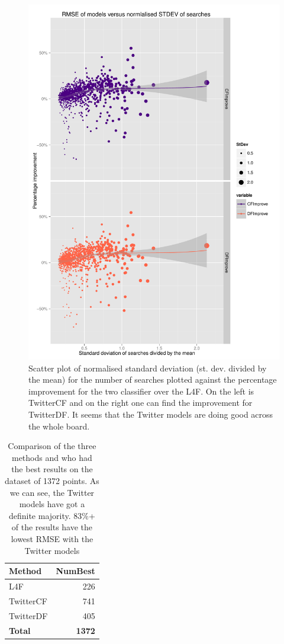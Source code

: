 \documentclass[minf,twoside,singlespacing,parskip,frontabs,notimes,11pt]{infthesis}
\begin{document}
\begin{figure}[]
\begin{center}
\includegraphics[scale=0.75]{rmse-nstdev}
\end{center}
\caption{Scatter plot of normalised standard deviation (st. dev. divided by the mean) for the number of searches plotted against the percentage improvement for the two classifier over the L4F. On the left is TwitterCF and on the right one can find the improvement for TwitterDF. It seems that the Twitter models are doing good across the whole board.}
\label{rmse-nstdev}
\end{figure}


\begin{table}[h]
\begin{center}
\begin{tabular}{ l | r }
Method & NumBest \\
\hline
L4F & 226 \\
TwitterCF & 741 \\
TwitterDF & 405 \\
\hline
\textbf{Total} & \textbf{1372}
\end{tabular}
\end{center}
\caption{Comparison of the three methods and who had the best results on the dataset of 1372 points. As we can see, the Twitter models have got a definite majority. 83\%+ of the results have the lowest RMSE with the Twitter models}
\label{comparison-all}
\end{table}
\end{document}
